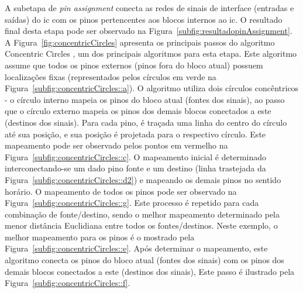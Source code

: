 A subetapa de \textit{pin assignment} conecta as redes de sinais de interface (entradas e saídas) do \ac{ic} com os pinos pertencentes aos blocos internos ao \ac{ic}.
O resultado final desta etapa pode ser observado na Figura~\ref{subfig:resultadopinAssignment}.
A Figura~\ref{fig:concentricCircles} apresenta os principais passos do algoritmo Concentric Circles \cite{koren1972pin, brady1984approach}, um dos principais algoritmos para esta etapa.
Este algoritmo assume que todos os pinos externos (pinos fora do bloco atual) possuem localizações fixas (representados pelos círculos em verde na Figura~\ref{subfig:concentricCircles::a}). 
O algoritmo utiliza dois círculos concêntricos - o círculo interno mapeia os pinos do bloco atual (fontes dos sinais), ao passo que o círculo externo mapeia os pinos dos demais blocos conectados a este (destinos dos sinais).
Para cada pino, é traçada uma linha do centro do círculo até sua posição, e sua posição é projetada para o respectivo círculo.
Este mapeamento pode ser observado pelos pontos em vermelho na Figura~\ref{subfig:concentricCircles::c}.
O mapeamento inicial é determinado interconectando-se um dado pino fonte e um destino (linha trastejada da Figura~\ref{subfig:concentricCircles::d2}) e mapeando os demais pinos no sentido horário.
O mapeamento de todos os pinos pode ser observado na Figura~\ref{subfig:concentricCircles::g}.
Este processo é repetido para cada combinação de fonte/destino, sendo o melhor mapeamento determinado pela menor distância Euclidiana entre todos os fontes/destinos.
Neste exemplo, o melhor mapeamento para os pinos é o mostrado pela Figura~\ref{subfig:concentricCircles::e}.
Após determinar o mapeamento, este algoritmo conecta os pinos do bloco atual (fontes dos sinais) com os pinos dos demais blocos conectados a este (destinos dos sinais), Este passo é ilustrado pela Figura~\ref{subfig:concentricCircles::f}.

